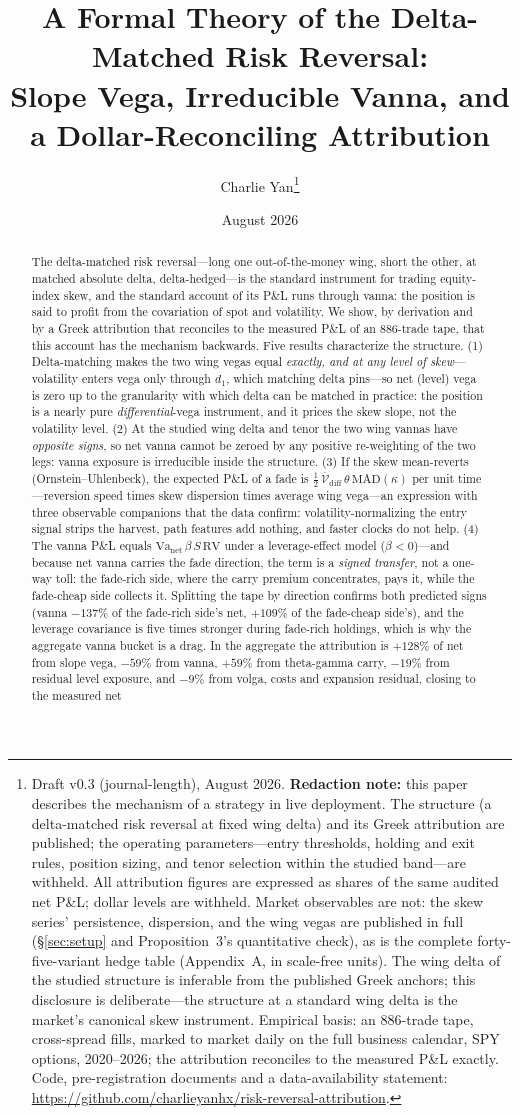 \documentclass[11pt]{article}
\title{\textbf{A Formal Theory of the Delta-Matched Risk Reversal:\\
Slope Vega, Irreducible Vanna, and a Dollar-Reconciling Attribution}}
\author{Charlie Yan\thanks{Draft v0.3 (journal-length), August 2026. \textbf{Redaction
note:} this paper describes the mechanism of a strategy in live deployment. The structure (a
delta-matched risk reversal at fixed wing delta) and its Greek attribution are published; the
operating parameters---entry thresholds, holding and exit rules, position sizing, and tenor
selection within the studied band---are withheld. All attribution figures are expressed as
shares of the same audited net P\&L; dollar levels are withheld. Market observables are not:
the skew series' persistence, dispersion, and the wing vegas are published in full
(\S\ref{sec:setup} and Proposition~3's quantitative check), as is the complete
forty-five-variant hedge table (Appendix~A, in scale-free units). The wing delta of the studied
structure is inferable from the published Greek anchors; this disclosure is deliberate---the
structure at a standard wing delta is the market's canonical skew instrument. Empirical basis:
an 886-trade tape, cross-spread fills, marked to market daily on the full business calendar,
SPY options, 2020--2026; the attribution reconciles to the measured P\&L exactly.
Code, pre-registration documents and a data-availability statement: \url{https://github.com/charlieyanhx/risk-reversal-attribution}.}}
\date{August 2026}
\newcommand{\Va}{\mathrm{Va}}
\begin{document}
\maketitle

\begin{abstract}
The delta-matched risk reversal---long one out-of-the-money wing, short the other, at matched
absolute delta, delta-hedged---is the standard instrument for trading equity-index skew, and
the standard account of its P\&L runs through vanna: the position is said to profit from the
covariation of spot and volatility. We show, by derivation and by a Greek attribution that
reconciles to the measured P\&L of an 886-trade tape, that this account has the mechanism
backwards. Five results characterize the structure. (1) Delta-matching makes the two wing
vegas equal \emph{exactly, and at any level of skew}---volatility enters vega only through
$d_1$, which matching delta pins---so net (level) vega is zero up to the granularity with which
delta can be matched in practice: the position is a nearly pure \emph{differential}-vega
instrument, and it prices the skew slope, not the volatility level. (2) At the studied wing
delta and tenor the two wing vannas have \emph{opposite signs}, so net vanna cannot be
zeroed by any positive re-weighting of the two legs: vanna exposure is irreducible inside the
structure. (3) If the skew mean-reverts (Ornstein--Uhlenbeck), the expected P\&L of a fade is
$\tfrac12\,\overline{\mathcal V}_{\mathrm{diff}}\,\theta\,\mathrm{MAD}(\kappa)$ per unit
time---reversion
speed times skew dispersion times average wing vega---an expression with three observable
companions that the data confirm: volatility-normalizing the entry signal strips the harvest,
path features add nothing, and faster clocks do not help. (4) The vanna P\&L equals
$\Va_{\mathrm{net}}\,\beta\,S\,\mathrm{RV}$ under a leverage-effect model ($\beta<0$)---and
because net vanna carries the fade direction, the term is a \emph{signed transfer}, not a
one-way toll: the fade-rich side, where the carry premium concentrates, pays it, while the
fade-cheap side collects it. Splitting the tape by direction confirms both predicted signs
(vanna $-137\%$ of the fade-rich side's net, $+109\%$ of the fade-cheap side's), and the
leverage covariance is five times stronger during fade-rich holdings, which is why the
aggregate vanna bucket is a drag. In the aggregate the attribution is $+128\%$ of net from slope
vega, $-59\%$ from vanna, $+59\%$ from theta-gamma carry, $-19\%$ from residual level
exposure, and $-9\%$ from volga, costs and expansion residual, closing to the measured net

\end{abstract}
\end{document}
